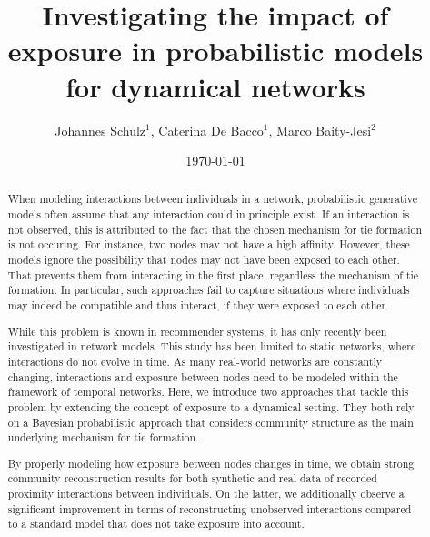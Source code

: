 \documentclass[12pt]{iopart}
\begin{document}
\title{Investigating the impact of exposure in probabilistic models for dynamical networks}

\author{Johannes Schulz$^1$, Caterina De Bacco$^1$, Marco Baity-Jesi$^2$}


\address{$^1$ Max Planck Institute for Intelligent Systems, Cyber Valley, Tuebingen, 72076, Germany}
\address{$^2$ Eawag, \"Uberlandstrasse 133, CH-8600 D\"ubendorf, Switzerland}

\vspace{10pt}

\date{\today}

\begin{abstract}
  When modeling interactions between individuals in a network, probabilistic generative models often assume that 
  any interaction could in principle exist. If an interaction is not observed, 
  this is attributed to the fact that the chosen mechanism for tie formation is not occuring. 
  For instance, two nodes may not have a high affinity. 
  However, these models ignore the possibility that nodes may not have been exposed to each other.
  That prevents them from interacting in the first place, regardless the mechanism of tie formation.
  In particular, such approaches fail to capture situations where individuals may indeed be compatible and thus interact, 
  if they were exposed to each other.
  
  While this problem is known in recommender systems, it has only recently been investigated in network models. 
  This study has been limited to static networks, where interactions do not evolve in time. 
  As many real-world networks are constantly changing, interactions and exposure between nodes need to be modeled 
  within the framework of temporal networks. Here, we introduce two approaches that tackle this problem by extending
  the concept of exposure to a dynamical setting. They both rely on a Bayesian probabilistic approach that considers 
  community structure as the main underlying mechanism for tie formation. 

  By properly modeling how exposure between nodes changes in time, we obtain strong community reconstruction results
  for both synthetic and real data of recorded proximity interactions between individuals. 
  On the latter, we additionally observe a significant improvement in terms of reconstructing unobserved interactions 
  compared to a standard model that does not take exposure into account.
\end{abstract}
\end{document}
